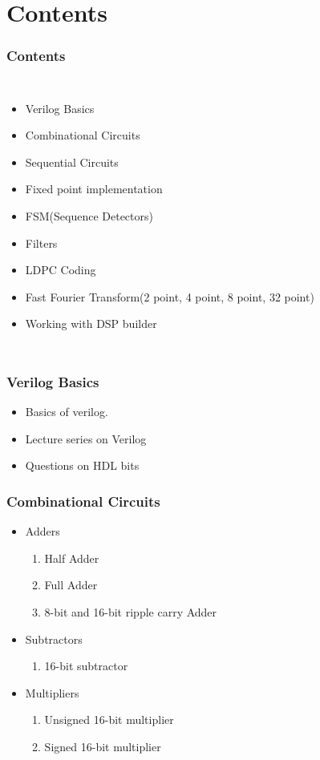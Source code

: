 \documentclass{beamer}
\begin{document}
\section{Contents}
\begin{frame}
\frametitle{Contents}
\begin{columns}
  \begin{itemize}
  \item Verilog Basics
  \item Combinational Circuits
  \item Sequential Circuits
  \item Fixed point implementation
  \item FSM(Sequence Detectors)
  \item Filters
  \item LDPC Coding
  \item Fast Fourier Transform(2 point, 4 point, 8 point, 32 point)
  \item Working with DSP builder

  \end{itemize}
\end{columns}

\end{frame}

\begin{frame}
	\frametitle{Verilog Basics}
	\begin{itemize}
		\item Basics of verilog.
		\item Lecture series on Verilog
		\item Questions on HDL bits
	\end{itemize}
\end{frame}

\begin{frame}
	\frametitle{Combinational Circuits}
	\begin{itemize}
		\item Adders
			\begin{enumerate}
				\item Half Adder
				\item Full Adder
				\item 8-bit and 16-bit ripple carry Adder
			\end{enumerate}
		\item Subtractors
			\begin{enumerate}
				\item 16-bit subtractor 
			\end{enumerate}
		\item Multipliers
			\begin{enumerate}
				\item Unsigned 16-bit multiplier
				\item Signed 16-bit multiplier
			\end{enumerate}
	\end{itemize}
\end{frame}
\end{document}
